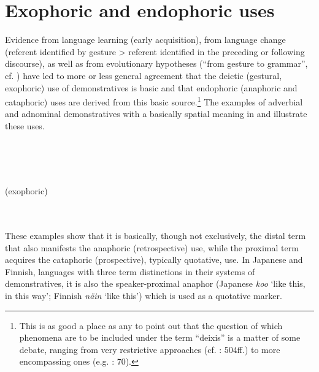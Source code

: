 \documentclass[output=paper,colorlinks,citecolor=brown]{langscibook}
\begin{document}
\section{Exophoric and endophoric uses}

Evidence from language learning (early acquisition), from language change (referent identified by gesture > referent identified in the preceding or following discourse), as well as from evolutionary hypotheses (“from gesture to grammar”, cf. \citealt{Arbib2012}) have led to more or less general agreement that the deictic (gestural, exophoric) use of demonstratives is basic and that endophoric (anaphoric and cataphoric) uses are derived from this basic source.\footnote{This is as good a place as any to point out that the question of which phenomena are to be included under the term “deixis” is a matter of some debate, ranging from very restrictive approaches (cf. \citealt{Kibrik2011}: 504ff.) to more encompassing ones (e.g. \citealt{Gerner2009}: 70).} The examples of adverbial and adnominal demonstratives with a basically spatial meaning in  and  illustrate these uses.

\ea\label{ex:koenig:1}
\\
\\
\\
\z
\z

\ea\label{ex:koenig:2}
 (exophoric)\\
\\
\\
\z
\z

These examples show that it is basically, though not exclusively, the distal term that also manifests the anaphoric (retrospective) use, while the proximal term acquires the cataphoric (prospective), typically quotative, use. In Japanese and Finnish, languages with three term distinctions in their systems of demonstratives, it is also the speaker-proximal anaphor (Japanese \textit{koo} ‘like this, in this way’; Finnish \textit{näin} ‘like this’) which is used as a quotative marker.
\end{document}
